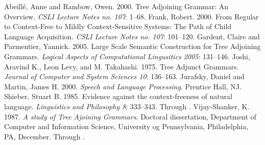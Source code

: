 \documentclass[12pt]{article}
\begin{document}
\singlespace
\begin{thebibliography}{4in}
 Abeill\'e, Anne and Rambow, Owen.  2000.  Tree
Adjoining Grammar: An Overview.  \textit{CSLI Lecture Notes no. 107}:
1--68.
 Frank, Robert.  2000.  From Regular to Context-Free
to Mildly Context-Sensitive Systems: The Path of Child Language
Acquisition.  \textit{CSLI Lecture Notes no. 107}: 101--120.
 Gardent, Claire and Parmentier, Yannick.  2005.
Large Scale Semantic Construction for Tree Adjoining Grammars.
\textit{Logical Aspects of Computational Lingusitics 2005}: 131--146.
 Joshi, Aravind K., Leon Levy, and M. Takahashi.
1975. Tree Adjunct Grammars. \textit{Journal of Computer and System
Sciences 10}: 136--163.
 Jurafsky, Daniel and Martin, James H. 2000.
\textit{Speech and Language Processing}.  Prentice Hall, NJ.
 Shieber, Stuart B.  1985. Evidence against the
context-freeness of natural language.  \textit{Linguistics and
Philosophy 8}: 333--343.  Through \cite{Abeille-2000}.
 Vijay-Shanker, K. 1987.  \textit{A study of
Tree Ajoining Grammars}.  Doctoral dissertation, Department of Computer
and Information Science, University og Pennsylvania, Philadelphia, PA,
December.  Through \cite{Abeille-2000}.
\end{thebibliography}
\end{document}
